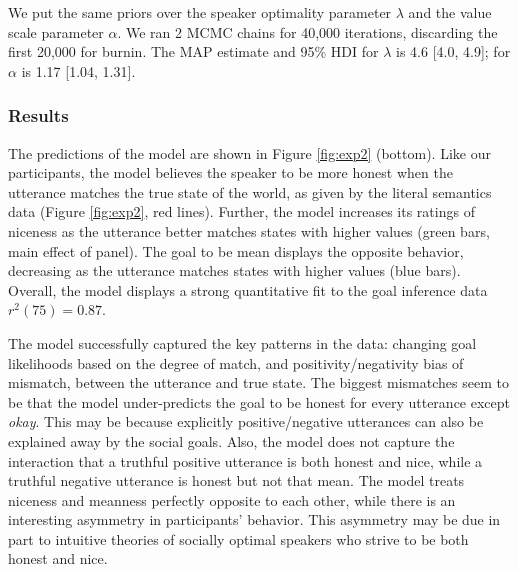 \documentclass[10pt,letterpaper]{article}
\begin{document}
We put the same priors over the speaker optimality parameter $\lambda$ and the value scale parameter $\alpha$.
We ran 2 MCMC chains for 40,000 iterations, discarding the first 20,000 for burnin.
The MAP estimate and 95\% HDI for $\lambda$ is 4.6 [4.0, 4.9]; for $\alpha$ is 1.17 [1.04, 1.31].%



\subsubsection{Results}
The predictions of the model are shown in Figure \ref{fig:exp2} (bottom).
Like our participants, the model believes the speaker to be more honest when the utterance matches the true state of the world, as given by the literal semantics data (Figure \ref{fig:exp2}, red lines).
Further, the model increases its ratings of niceness as the utterance better matches states with higher values (green bars, main effect of panel).
The goal to be mean displays the opposite behavior, decreasing as the utterance matches states with higher values (blue bars).
Overall, the model displays a strong quantitative fit to the goal inference data $r^2(75) = 0.87$.



The model successfully captured the key patterns in the data:
changing goal likelihoods based on the degree of match, and positivity/negativity bias of mismatch, between the utterance and true state.
The biggest mismatches seem to be that the model under-predicts the goal to be honest for every utterance except \emph{okay}.
This may be because explicitly positive/negative utterances can also be explained away by the social goals.
Also, the model does not capture the interaction that a truthful positive utterance is both honest and nice, while a truthful negative utterance is honest but not that mean.
 The model treats niceness and meanness perfectly opposite to each other, while there is an interesting asymmetry in participants' behavior. 
This asymmetry may be due in part to intuitive theories of socially optimal speakers who strive to be both honest and nice.
\end{document}
